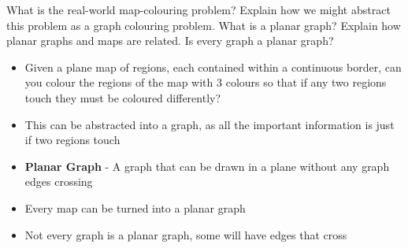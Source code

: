 \documentclass[addpoints]{exam}
\begin{document}
\begin{questions}
\question[7]What is the real-world map-colouring problem? Explain how we might abstract this problem as a graph colouring problem. What is a planar graph? Explain how planar graphs and maps are related. Is every graph a planar graph?
\begin{solution}[2in]
	\begin{itemize}
		\item Given a plane map of regions, each contained within a continuous border, can you colour the regions of the map with 3 colours so that if any two regions touch they must be coloured differently?
		\item This can be abstracted into a graph, as all the important information is just if two regions touch
		\item \textbf{Planar Graph} - A graph that can be drawn in a plane without any graph edges crossing
		\item Every map can be turned into a planar graph
		\item Not every graph is a planar graph, some will have edges that cross
	\end{itemize}
\end{solution}


\end{questions}
\end{document}
